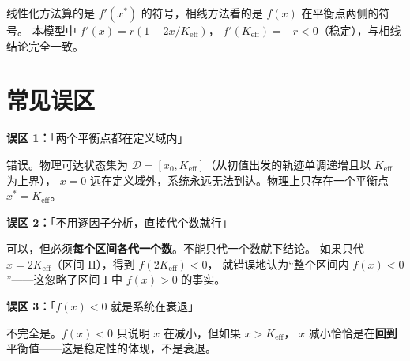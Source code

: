 \documentclass[12pt,a4paper]{article}
\begin{document}
线性化方法算的是 $f'(x^*)$ 的符号，相线方法看的是 $f(x)$ 在平衡点两侧的符号。
本模型中 $f'(x) = r(1 - 2x/K_{\text{eff}})$，
$f'(K_{\text{eff}}) = -r < 0$（稳定），与相线结论完全一致。

\section{常见误区}

\textbf{误区 1：}「两个平衡点都在定义域内」

错误。物理可达状态集为 $\mathcal{D} = [x_0, K_{\text{eff}}]$（从初值出发的轨迹单调递增且以 $K_{\text{eff}}$ 为上界），
$x = 0$ 远在定义域外，系统永远无法到达。物理上只存在一个平衡点 $x^* = K_{\text{eff}}$。

\medskip
\textbf{误区 2：}「不用逐因子分析，直接代个数就行」

可以，但必须\textbf{每个区间各代一个数}。不能只代一个数就下结论。
如果只代 $x = 2K_{\text{eff}}$（区间 II），得到 $f(2K_{\text{eff}}) < 0$，
就错误地认为``整个区间内 $f(x) < 0$''——这忽略了区间 I 中 $f(x) > 0$ 的事实。

\medskip
\textbf{误区 3：}「$f(x) < 0$ 就是系统在衰退」

不完全是。$f(x) < 0$ 只说明 $x$ 在减小，但如果 $x > K_{\text{eff}}$，
$x$ 减小恰恰是在\textbf{回到}平衡值——这是稳定性的体现，不是衰退。
\end{document}
